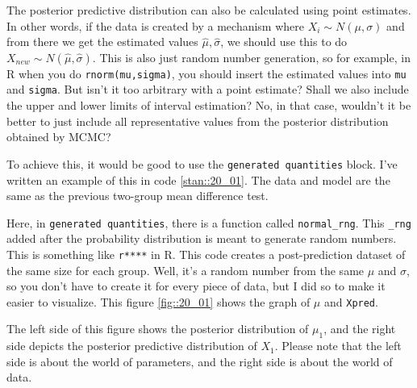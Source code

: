\documentclass{ltjsbook}
\begin{document}
The posterior predictive distribution can also be calculated using point estimates. In other words, if the data is created by a mechanism where $X_{i}\sim N(\mu,\sigma)$ and from there we get the estimated values $\hat{\mu},\hat{\sigma}$, we should use this to do $X_{new}\sim N(\hat{\mu},\hat{\sigma})$. This is also just random number generation, so for example, in R when you do \verb|rnorm(mu,sigma)|, you should insert the estimated values into \verb|mu| and \verb|sigma|.
But isn't it too arbitrary with a point estimate? Shall we also include the upper and lower limits of interval estimation? No, in that case, wouldn't it be better to just include all representative values from the posterior distribution obtained by MCMC?

To achieve this, it would be good to use the \verb|generated quantities| block. I've written an example of this in code \ref{stan::20_01}. The data and model are the same as the previous two-group mean difference test.

Here, in \verb|generated quantities|, there is a function called \verb|normal_rng|. This \verb|_rng| added after the probability distribution is meant to generate random numbers. This is something like \verb|r****| in R.
This code creates a post-prediction dataset of the same size for each group. Well, it's a random number from the same $\mu$ and $\sigma$, so you don't have to create it for every piece of data, but I did so to make it easier to visualize.
This figure \ref{fig::20_01} shows the graph of $\mu$ and \verb|Xpred|.

The left side of this figure shows the posterior distribution of $\mu_1$, and the right side depicts the posterior predictive distribution of $X_1$. Please note that the left side is about the world of parameters, and the right side is about the world of data.
\end{document}
